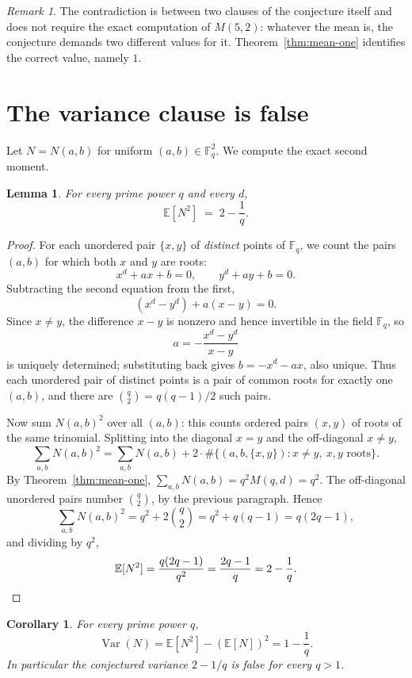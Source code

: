 \documentclass[11pt]{article}
\newtheorem{lemma}[theorem]{Lemma}
\newtheorem{corollary}[theorem]{Corollary}
\theoremstyle{definition}
\theoremstyle{remark}
\newtheorem{remark}[theorem]{Remark}
\begin{document}
\begin{remark}
The contradiction is between two clauses of the conjecture itself and does not
require the exact computation of $M(5,2)$: whatever the mean is, the conjecture
demands two different values for it. Theorem~\ref{thm:mean-one} identifies the
correct value, namely $1$.
\end{remark}

\section{The variance clause is false}

Let $N = N(a,b)$ for uniform $(a,b) \in \mathbb{F}_q^2$. We compute the exact
second moment.

\begin{lemma}\label{lem:second-moment}
For every prime power $q$ and every $d$,
\[
\mathbb{E}[N^2] \;=\; 2 - \frac{1}{q}.
\]
\end{lemma}

\begin{proof}
For each unordered pair $\{x,y\}$ of \emph{distinct} points of $\mathbb{F}_q$, we
count the pairs $(a,b)$ for which both $x$ and $y$ are roots:
\[
x^d + ax + b = 0, \qquad y^d + ay + b = 0.
\]
Subtracting the second equation from the first,
\[
(x^d - y^d) + a(x-y) = 0.
\]
Since $x \ne y$, the difference $x-y$ is nonzero and hence invertible in the field
$\mathbb{F}_q$, so
\[
a = -\frac{x^d - y^d}{x-y}
\]
is uniquely determined; substituting back gives $b = -x^d - ax$, also unique.
Thus each unordered pair of distinct points is a pair of common roots for exactly
one $(a,b)$, and there are $\binom{q}{2} = q(q-1)/2$ such pairs.

Now sum $N(a,b)^2$ over all $(a,b)$: this counts ordered pairs $(x,y)$ of roots of
the same trinomial. Splitting into the diagonal $x=y$ and the off-diagonal
$x \ne y$,
\[
\sum_{a,b} N(a,b)^2
= \sum_{a,b} N(a,b) + 2 \cdot \#\{(a,b,\{x,y\}) : x \ne y,\ x,y \text{ roots}\}.
\]
By Theorem~\ref{thm:mean-one}, $\sum_{a,b} N(a,b) = q^2 M(q,d) = q^2$. The
off-diagonal unordered pairs number $\binom{q}{2}$, by the previous paragraph.
Hence
\[
\sum_{a,b} N(a,b)^2 = q^2 + 2\binom{q}{2}
= q^2 + q(q-1) = q(2q-1),
\]
and dividing by $q^2$,
\[
\mathbb{E}[N^2] = \frac{q(2q-1)}{q^2} = \frac{2q-1}{q} = 2 - \frac{1}{q}. \qedhere
\]
\end{proof}

\begin{corollary}\label{cor:variance}
For every prime power $q$,
\[
\operatorname{Var}(N) = \mathbb{E}[N^2] - (\mathbb{E}[N])^2 = 1 - \frac{1}{q}.
\]
In particular the conjectured variance $2 - 1/q$ is false for every $q>1$.
\end{corollary}
\end{document}
